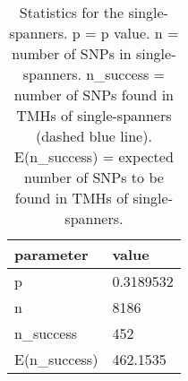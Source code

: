 \begin{table}

\caption{\label{tab:snp_stats_per_spanner_single}Statistics for the single-spanners. p = p value. n = number of SNPs in single-spanners. n\_success = number of SNPs found in TMHs of single-spanners (dashed blue line). E(n\_success) = expected number of SNPs to be found in TMHs of single-spanners. }
\centering
\begin{tabular}[t]{l|l}
\hline
parameter & value\\
\hline
p & 0.3189532\\
\hline
n & 8186\\
\hline
n\_success & 452\\
\hline
E(n\_success) & 462.1535\\
\hline
\end{tabular}
\end{table}
